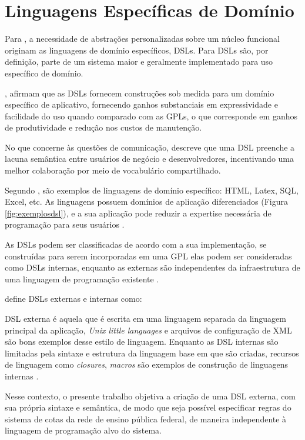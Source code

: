 \section{Linguagens Específicas de Domínio}
\label{sec:dsl}

Para , a necessidade de abstrações personalizadas sobre um núcleo funcional originam as linguagens de domínio específicos, \gls{DSL}s. Para  \gls{DSL}s são, por definição, parte de um sistema maior e geralmente implementado para uso específico de domínio.

, afirmam que as \gls{DSL}s fornecem construções sob medida para um domínio específico de aplicativo, fornecendo ganhos substanciais em expressividade e facilidade do uso quando comparado com as \gls{GPL}s, o que corresponde em ganhos de produtividade e redução nos custos de manutenção.

No que concerne às questões de comunicação,  descreve que uma \gls{DSL} preenche a lacuna semântica entre usuários de negócio e desenvolvedores, incentivando uma melhor colaboração por meio de vocabulário compartilhado.  

Segundo , são exemplos de linguagens de domínio específico: HTML, Latex, SQL, Excel, etc. As linguagens possuem domínios de aplicação diferenciados (Figura \ref{fig:exemplosdsl}), e a sua aplicação pode reduzir a expertise necessária de programação para seus usuários .




As \gls{DSL}s podem ser classificadas de acordo com a sua implementação, se construídas para serem incorporadas em uma \gls{GPL} elas podem ser consideradas como \gls{DSL}s internas, enquanto as externas são independentes da infraestrutura de uma linguagem de programação existente \cite{dslengineering}.

 define \gls{DSL}s externas e internas como:

\begin{citacao} 
\gls{DSL} externa é aquela que é escrita em uma linguagem separada da linguagem principal da aplicação, \textit{Unix little languages} e arquivos de configuração de \gls{XML} são bons exemplos desse estilo de linguagem. Enquanto as \gls{DSL} internas são limitadas pela sintaxe e estrutura da linguagem base em que são criadas, recursos de linguagem como \textit{closures}, \textit{macros} são exemplos de construção de linguagens internas \cite[s/p, tradução nossa]{fowler2005language}.
\end{citacao}


Nesse contexto, o presente trabalho objetiva a criação de uma \gls{DSL} externa, com sua própria sintaxe e semântica, de modo que seja possível especificar regras do sistema de cotas da rede de ensino pública federal, de maneira independente à linguagem de programação alvo do sistema. 



